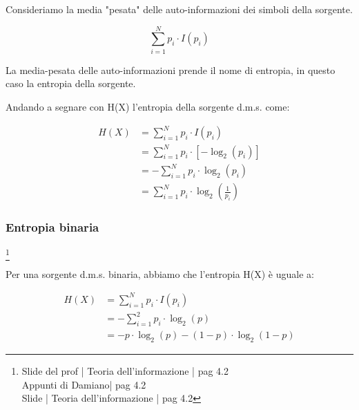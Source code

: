 Consideriamo la media "pesata" delle auto-informazioni dei simboli della sorgente. \newline 

{
    \Large 
    \begin{equation}
        \sum_{i = 1}^{N}
        p_i \cdot I(p_i)
    \end{equation}
}


La media-pesata delle auto-informazioni prende il nome di entropia, in questo caso la entropia della sorgente. \newline 

Andando a segnare con H(X) l'entropia della sorgente d.m.s. come: 

{
    \Large 
    \begin{equation}
        \begin{split}
        H(X)
        &= 
        \sum_{i = 1}^{N}
        p_i \cdot I(p_i)
        \\
        &=
        \sum_{i = 1}^{N}
        p_i \cdot \left[ - \log_{2} (p_i)\right]
        \\
        &=
        -
        \sum_{i = 1}^{N}
        p_i \cdot \log_{2} (p_i)
        \\
        &= 
        \sum_{i = 1}^{N}
        p_i \cdot  \log_{2} \left(\frac{1}{p_i} \right)
        \end{split}
    \end{equation}
}

\newpage 

\subsubsection{Entropia binaria}
\footnote{Slide del prof | Teoria dell'informazione | pag 4.2 \\  
Appunti di Damiano| pag 4.2 \\
Slide | Teoria dell'informazione | pag 4.2 }

Per una sorgente d.m.s. binaria, abbiamo che l'entropia H(X) è uguale a: 

{
    \Large
    \begin{equation}
        \begin{split}
            H(X)
            &=
            \sum_{i = 1}^{N}
            p_i \cdot I(p_i)
            \\
            &=
            -
            \sum_{i = 1}^{2}
            p_i \cdot \log_{2}(p)
            \\
            &= 
            - p \cdot \log_{2} (p)
            - (1 - p) \cdot \log_{2} (1 - p)
        \end{split}
    \end{equation}
}

